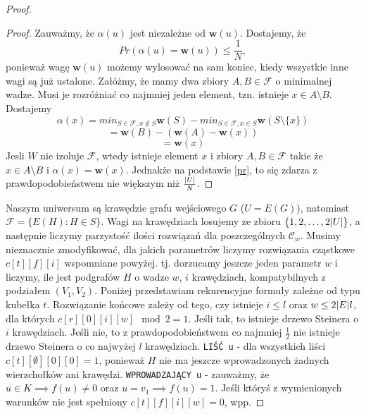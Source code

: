 \documentclass[12pt, oneside]{report}
\begin{document}
\begin{proof}
\begin{proof}
Zauważmy, że $\alpha(u)$ jest niezależne od $\textbf{w}(u)$. Dostajemy, że
\begin{equation}
\label{pr}
Pr(\alpha(u) = \mathbf{w}(u)) \leq \frac{1}{N},
\end{equation}
ponieważ wagę $\mathbf{w}(u)$ możemy wylosować na sam koniec, kiedy wszystkie inne wagi są już ustalone.
Załóżmy, że mamy dwa zbiory $A, B \in \mathcal{F}$ o minimalnej wadze. Musi je rozróżniać co najmniej jeden element, tzn. istnieje $x \in A \setminus B$. Dostajemy
$$\alpha(x) = min_{S \in \mathcal{F}, x \notin S} \mathbf{w}(S) - min_{S \in \mathcal{F}, x \in S} \mathbf{w}(S \setminus \{x\})$$
$$= \mathbf{w}(B) - (\mathbf{w}(A) - \mathbf{w}(x))$$
$$= \mathbf{w}(x)$$
Jesli $W$ nie izoluje $\mathcal{F}$, wtedy istnieje element $x$ i zbiory $A, B \in \mathcal{F}$ takie że $x \in A \setminus B$ i $\alpha(x) = \mathbf{w}(x)$. Jednakże na podstawie \ref{pr}, to się zdarza z prawdopodobieństwem nie większym niż $\frac{\abs{U}}{N}$.
\end{proof}

Naszym uniwersum są krawędzie grafu wejściowego $G$ ($U = E(G)$), natomiast $\mathcal{F} = \{E(H) : H \in S\}$. Wagi na krawędziach losujemy ze zbioru $\{1,2, \ldots, 2 \abs{U}\}$, a następnie liczymy parzystość ilości rozwiązań dla poszczególnych $\mathcal{C}_w$. Musimy nieznacznie zmodyfikować, dla jakich parametrów liczymy rozwiązania cząstkowe $c[t][f][i]$ wspomniane powyżej. tj. dorzucamy jeszcze jeden parametr $w$ i liczymy, ile jest podgrafów $H$ o wadze $w$, $i$ krawędziach, kompatybilnych z podziałem $(V_1, V_2)$. Poniżej przedstawiam rekurencyjne formuły zależne od typu kubełka $t$. Rozwiązanie końcowe zależy od tego, czy istnieje $i \leq l$ oraz $w  \leq 2\abs{E}l$, dla których  $c[r][0][i][w] \mod 2 = 1$. Jeśli tak, to istnieje drzewo Steinera o $i$ krawędziach. Jeśli nie, to z prawdopodobieństwem co najmniej $\frac{1}{2}$ nie istnieje drzewo Steinera o co najwyżej $l$ krawędziach. 
\newline\newline
\texttt{LIŚĆ u} - dla wszystkich liści $c[t][\emptyset][0][0] = 1$, ponieważ $H$ nie ma jeszcze wprowadzonych żadnych wierzchołków ani krawędzi.
\newline\newline
\texttt{WPROWADZAJĄCY u} - zauważmy, że $u \in K \implies f(u) \neq 0$ oraz $u = v_1 \implies f(u) = 1$. Jeśli któryś z wymienionych warunków nie jest spełniony $c[t][f][i][w] = 0$, wpp.


\end{proof}
\end{document}
